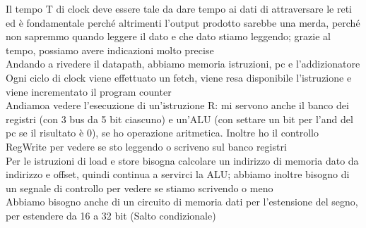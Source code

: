 \documentclass[class=book, crop=false, oneside]{standalone}
\begin{document}
Il tempo T di clock deve essere tale da dare tempo ai dati di attraversare le reti ed è fondamentale perché altrimenti l’output prodotto sarebbe una merda, perché non sapremmo quando leggere il dato e che dato stiamo leggendo; grazie al tempo, possiamo avere indicazioni molto precise\\

Andando a rivedere il datapath, abbiamo memoria istruzioni, pc e l’addizionatore\\

Ogni ciclo di clock viene effettuato un fetch, viene resa disponibile l’istruzione e viene incrementato il program counter\\

Andiamoa  vedere l’esecuzione di un’istruzione R: mi servono anche il banco dei registri (con 3 bus da 5 bit ciascuno) e un’ALU (con settare un bit per l’and del pc se il risultato è 0), se ho operazione aritmetica. Inoltre ho il controllo RegWrite per vedere se sto leggendo o scriveno sul banco registri\\

Per le istruzioni di load e store bisogna calcolare un indirizzo di memoria dato da indirizzo e offset, quindi continua a servirci la ALU; abbiamo inoltre bisogno di un segnale di controllo per vedere se stiamo scrivendo o meno\\

Abbiamo bisogno anche di un circuito di memoria dati per l’estensione del segno, per estendere da 16 a 32 bit
(Salto condizionale)
\end{document}
